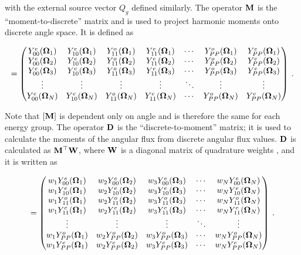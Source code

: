 \noindent with the external source vector $Q_g$
defined similarly. The operator $\mathbf{M}$ is the ``moment-to-discrete'' matrix and is 
used to project harmonic moments onto discrete angle space. It is defined as

\begin{equation}
[\ve{M}] = \begin{pmatrix}
\Ye{00}{1} & \Ye{10}{1} & \Yo{11}{1} & \Ye{11}{1} & \cdots & \Yo{PP}{1} & \Ye{PP}{1} \\
\Ye{00}{2} & \Ye{10}{2} & \Yo{11}{2} & \Ye{11}{2} & \cdots & \Yo{PP}{2} & \Ye{PP}{2} \\
\Ye{00}{3} & \Ye{10}{3} & \Yo{11}{3} & \Ye{11}{3} & \cdots & \Yo{PP}{3} & \Ye{PP}{3} \\
\vdots     & \vdots     & \vdots     & \vdots     & \ddots & \vdots     & \vdots     \\
\Ye{00}{N} & \Ye{10}{N} & \Yo{11}{N} & \Ye{11}{N} & \cdots & \Yo{PP}{N} & \Ye{PP}{N}
  \end{pmatrix}\:.
\label{mtod}
\end{equation}

\noindent Note that $[\mathbf{M}]$ is dependent only on angle and is therefore the same for
each energy group. The operator $\mathbf{D}$ is the ``discrete-to-moment'' matrix; it is
used to calculate the moments of the angular flux from discrete angular flux values. 
$\mathbf{D}$ is calculated as $\mathbf{M}^\top\mathbf{W}$, where $\mathbf{W}$ is a diagonal matrix of 
quadrature weights \cite{exmm}, and it is written as

\begin{equation}
  [\ve{D}] = \begin{pmatrix}
    w_1\Ye{00}{1} & w_2\Ye{00}{2} & w_3\Ye{00}{3} & \cdots & w_N\Ye{00}{N} \\ 
    w_1\Ye{10}{1} & w_2\Ye{10}{2} & w_3\Ye{10}{3} & \cdots & w_N\Ye{10}{N} \\
    w_1\Yo{11}{1} & w_2\Yo{11}{2} & w_3\Yo{11}{3} & \cdots & w_N\Yo{11}{N} \\
    w_1\Ye{11}{1} & w_2\Ye{11}{2} & w_3\Ye{11}{3} & \cdots & w_N\Ye{11}{N} \\
    \vdots        & \vdots        & \vdots        & \ddots & \vdots        \\
    w_1\Yo{PP}{1} & w_2\Yo{PP}{2} & w_3\Yo{PP}{3} & \cdots & w_N\Yo{PP}{N} \\
    w_1\Ye{PP}{1} & w_2\Ye{PP}{2} & w_3\Ye{PP}{3} & \cdots & w_N\Ye{PP}{N}
  \end{pmatrix}\:.
\end{equation}

